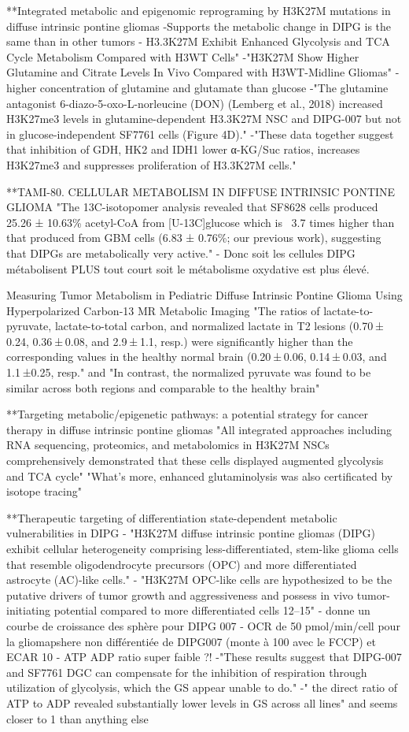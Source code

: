 \documentclass[11pt,a4paper]{article}
\begin{document}
**Integrated metabolic and epigenomic reprograming by H3K27M mutations in diffuse intrinsic pontine gliomas
-Supports the metabolic change in DIPG is the same than in other tumors
- H3.3K27M Exhibit Enhanced Glycolysis and TCA Cycle Metabolism Compared with H3WT Cells"
-"H3K27M Show Higher Glutamine and Citrate Levels In Vivo Compared with H3WT-Midline Gliomas"
- higher concentration of glutamine and glutamate than glucose
-"The glutamine antagonist 6-diazo-5-oxo-L-norleucine (DON) (Lemberg et al., 2018) increased H3K27me3 levels in glutamine-dependent H3.3K27M NSC and DIPG-007 but not in glucose-independent SF7761 cells (Figure 4D)."
-"These data together suggest that inhibition of GDH, HK2 and IDH1 lower α-KG/Suc ratios, increases H3K27me3 and suppresses proliferation of H3.3K27M cells."

**TAMI-80. CELLULAR METABOLISM IN DIFFUSE INTRINSIC PONTINE GLIOMA
"The 13C-isotopomer analysis revealed that SF8628 cells produced 25.26 ± 10.63\% acetyl-CoA from [U-13C]glucose which is ~3.7 times higher than that produced from GBM cells (6.83 ± 0.76\%; our previous work), suggesting that DIPGs are metabolically very active."
- Donc soit les cellules DIPG métabolisent PLUS tout court soit le métabolisme oxydative est plus élevé.

Measuring Tumor Metabolism in Pediatric Diffuse Intrinsic Pontine Glioma Using Hyperpolarized Carbon-13 MR Metabolic Imaging
"The ratios of lactate-to-pyruvate, lactate-to-total carbon, and normalized lactate in T2 lesions (0.70 ± 0.24, 0.36 ± 0.08, and 2.9 ± 1.1, resp.) were significantly higher than the corresponding values in the healthy normal brain (0.20 ± 0.06, 0.14 ± 0.03, and 1.1 ±0.25, resp." and "In contrast, the normalized pyruvate was found to be similar across both regions and comparable to the healthy brain"


**Targeting metabolic/epigenetic pathways: a potential strategy for cancer therapy in diffuse intrinsic pontine gliomas
"All integrated approaches including RNA sequencing, proteomics, and metabolomics in H3K27M NSCs comprehensively demonstrated that these cells displayed augmented glycolysis and TCA cycle"
"What’s more, enhanced glutaminolysis was also certificated by isotope tracing"

**Therapeutic targeting of differentiation state-dependent metabolic vulnerabilities in DIPG
- "H3K27M diffuse intrinsic pontine gliomas (DIPG) exhibit cellular heterogeneity comprising less-differentiated, stem-like glioma cells that resemble oligodendrocyte precursors (OPC) and more differentiated astrocyte (AC)-like cells."
- "H3K27M OPC-like cells are hypothesized to be the putative drivers of tumor growth and aggressiveness and possess in vivo tumor-initiating potential compared to more differentiated cells 12–15"
- donne un courbe de croissance des sphère pour DIPG 007
- OCR de 50  pmol/min/cell pour la gliomapshere non différentiée de DIPG007 (monte à 100 avec le FCCP) et ECAR 10
- ATP ADP ratio super faible ?!
-"These results suggest that DIPG-007 and SF7761 DGC can compensate for the inhibition of respiration through utilization of glycolysis, which the GS appear unable to do."
-" the direct ratio of ATP to ADP revealed substantially lower levels in GS across all lines" and seems closer to 1 than anything else
\end{document}
